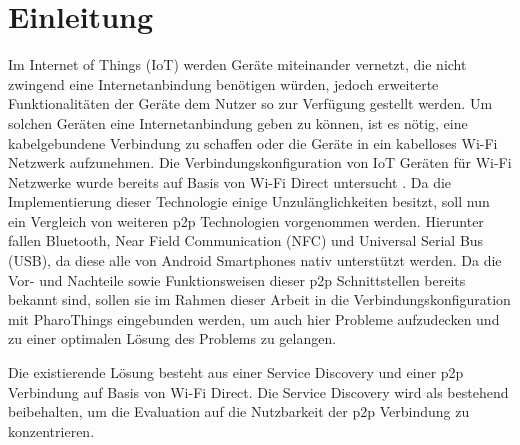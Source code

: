 \section{Einleitung}
        Im Internet of Things (IoT) werden Geräte miteinander vernetzt, die nicht zwingend eine Internetanbindung benötigen würden, jedoch erweiterte Funktionalitäten der Geräte dem Nutzer so zur Verfügung gestellt werden. Um solchen Geräten eine Internetanbindung geben zu können, ist es nötig, eine kabelgebundene Verbindung zu schaffen oder die Geräte in ein kabelloses Wi-Fi Netzwerk aufzunehmen. Die Verbindungskonfiguration von IoT Geräten für Wi-Fi Netzwerke wurde bereits auf Basis von Wi-Fi Direct untersucht \cite{aiProject}. Da die Implementierung dieser Technologie einige Unzulänglichkeiten besitzt, soll nun ein Vergleich von weiteren p2p Technologien vorgenommen werden. Hierunter fallen Bluetooth, Near Field Communication (NFC) und Universal Serial Bus (USB), da diese alle von Android Smartphones nativ unterstützt werden. Da die Vor- und Nachteile sowie Funktionsweisen dieser p2p Schnittstellen bereits bekannt sind, sollen sie im Rahmen dieser Arbeit in die Verbindungskonfiguration mit PharoThings eingebunden werden, um auch hier Probleme aufzudecken und zu einer optimalen Lösung des Problems zu gelangen.
        
        Die existierende Lösung besteht aus einer Service Discovery und einer p2p \linebreak Verbindung auf Basis von Wi-Fi Direct. Die Service Discovery wird als bestehend beibehalten, um die Evaluation auf die Nutzbarkeit der p2p Verbindung zu konzentrieren.

